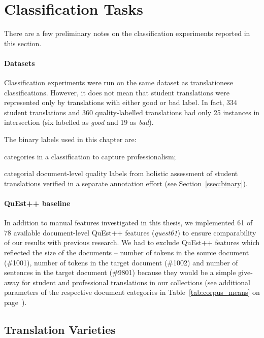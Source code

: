 \section{\label{sec:labels}Classification Tasks}

There are a few preliminary notes on the classification experiments reported in this section. 

\paragraph{Datasets} 
Classification experiments were run on the same dataset as translationese classifications. However, it does not mean that student translations were represented only by translations with either good or bad label. In fact, 334 student translations and 360 quality-labelled translations had only 25 instances in intersection (six labelled as \textit{good} and 19 as \textit{bad}). 

The binary labels used in this chapter are: 
\begin{description}\compresslist{}
	\item[stu vs pro:] categories in a classification to capture professionalism;
	\item[bad vs good:] categorial document-level quality labels from holistic assessment of student translations verified in a separate annotation effort (see Section~\ref{ssec:binary}).
\end{description}

\paragraph{QuEst++ baseline}
In addition to manual features investigated in this thesis, we implemented 61 of 78 available document-level QuEst++ features (\textit{quest61}) to ensure comparability of our results with previous research.
We had to exclude QuEst++ features which reflected the size of the documents -- number of tokens in the source document (\#1001), number of tokens in the target document (\#1002) and number of sentences in the target document (\#9801) because they would be a simple give-away for student and professional translations in our collections (see additional parameters of the respective document categories in Table~\ref{tab:corpus_means} on page~\pageref{tab:corpus_means}).  

\subsection{\label{ssec:var}Translation Varieties}

